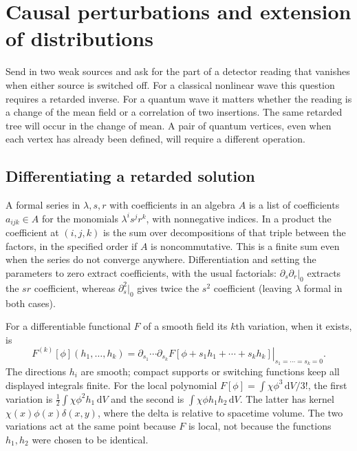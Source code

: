 \chapter{Causal perturbations and extension of distributions}\label{f:extension}

Send in two weak sources and ask for the part of a detector reading that
vanishes when either source is switched off. For a classical nonlinear
wave this question requires a retarded inverse. For a quantum wave it
matters whether the reading is a change of the mean field or a correlation
of two insertions. The same retarded tree will occur in the change of
mean. A pair of quantum vertices, even when each vertex has already been
defined, will require a different operation.

\section{Differentiating a retarded solution}
A formal series in $\lambda,s,r$ with coefficients in an algebra $A$ is
a list of coefficients $a_{ijk}\in A$ for the monomials $\lambda^i s^j
r^k$, with nonnegative indices. In a product the coefficient at $(i,j,k)$
is the sum over decompositions of that triple between the factors, in the
specified order if $A$ is noncommutative. This is a finite sum even when
the series do not converge anywhere. Differentiation and setting the
parameters to zero extract coefficients, with the usual factorials:
$\partial_s\partial_r|_0$ extracts the $sr$ coefficient, whereas
$\partial_s^2|_0$ gives twice the $s^2$ coefficient (leaving $\lambda$
formal in both cases).

For a differentiable functional $F$ of a smooth field its $k$th variation,
when it exists, is
\[
 F^{(k)}[\phi](h_1,\ldots,h_k)=
 \left.\partial_{s_1}\cdots\partial_{s_k}
 F[\phi+s_1h_1+\cdots+s_kh_k]\right|_{s_1=\cdots=s_k=0} .
\]
The directions $h_i$ are smooth; compact supports or switching functions
keep all displayed integrals finite. For the local polynomial
$F[\phi]=\int\chi\phi^3\,\mathrm{d}V/3!$, the first variation is
$\tfrac12\int\chi\phi^2 h_1\,\mathrm{d}V$ and the second is
$\int\chi\phi h_1 h_2\,\mathrm{d}V$. The latter has kernel
$\chi(x)\phi(x)\delta(x,y)$, where the delta is relative to spacetime
volume. The two variations act at the same point because $F$ is local,
not because the functions $h_1,h_2$ were chosen to be identical.

